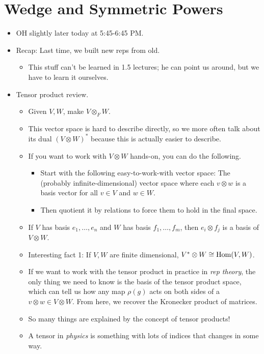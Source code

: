 \documentclass[../notes.tex]{subfiles}
\begin{document}
\section{Wedge and Symmetric Powers}
\begin{itemize}
    \item {}OH slightly later today at 5:45-6:45 PM.
    \item Recap: Last time, we built new reps from old.
    \begin{itemize}
        \item This stuff can't be learned in 1.5 lectures; he can point us around, but we have to learn it ourselves.
    \end{itemize}
    \item Tensor product review.
    \begin{itemize}
        \item Given $V,W$, make $V\otimes_FW$.
        \item This vector space is hard to describe directly, so we more often talk about its dual $(V\otimes W)^*$ because this is actually easier to describe.
        \item If you want to work with $V\otimes W$ hands-on, you can do the following.
        \begin{itemize}
            \item Start with the following easy-to-work-with vector space: The (probably infinite-dimensional) vector space where each $v\otimes w$ is a basis vector for all $v\in V$ and $w\in W$.
            \item Then quotient it by relations to force them to hold in the final space.
        \end{itemize}
        \item If $V$ has basis $e_1,\dots,e_n$ and $W$ has basis $f_1,\dots,f_m$, then $e_i\otimes f_j$ is a basis of $V\otimes W$.
        \item Interesting fact 1: If $V,W$ are finite dimensional, $V^*\otimes W\cong\operatorname{Hom}(V,W)$.
        \item If we want to work with the tensor product in practice in \emph{rep theory}, the only thing we need to know is the basis of the tensor product space, which can tell us how any map $\rho(g)$ acts on both sides of a $v\otimes w\in V\otimes W$. From here, we recover the Kronecker product of matrices.
        \item So many things are explained by the concept of tensor products!
        \item A tensor in \emph{physics} is something with lots of indices that changes in some way.

\end{itemize}
\end{itemize}
\end{document}
